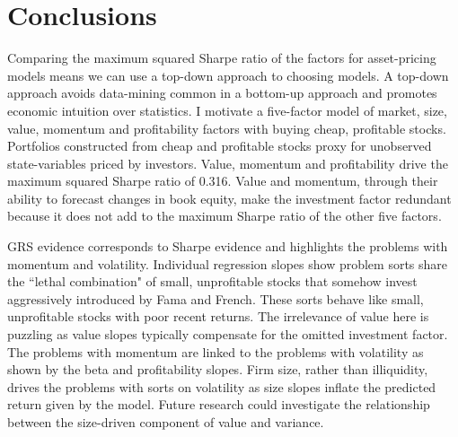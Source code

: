 
\section*{Conclusions}

Comparing the maximum squared Sharpe ratio of the factors for asset-pricing
models means we can use a top-down approach to choosing models.
A top-down approach avoids data-mining common in a bottom-up approach and
promotes economic intuition over statistics.
I motivate a five-factor model of market, size, value, momentum and
profitability factors with buying cheap, profitable stocks.
Portfolios constructed from cheap and profitable stocks proxy for
unobserved state-variables priced by investors.
Value, momentum and profitability drive the maximum squared Sharpe ratio of
0.316.
Value and momentum, through their ability to forecast changes in book equity,
make the investment factor redundant because it does not add
to the maximum Sharpe ratio of the other five factors.

GRS evidence corresponds to Sharpe evidence and highlights the problems with
momentum and volatility.
Individual regression slopes show problem sorts share the ``lethal combination"
of small, unprofitable stocks that somehow invest aggressively introduced by
Fama and French.
These sorts behave like small, unprofitable stocks with poor recent returns.
The irrelevance of value here is puzzling as value slopes typically
compensate for the omitted investment factor.
The problems with momentum are linked to the problems with volatility as shown
by the beta and profitability slopes.
Firm size, rather than illiquidity, drives the problems with sorts on volatility as size
slopes inflate the predicted return given by the model.
Future research could investigate the relationship between the size-driven
component of value and variance.
